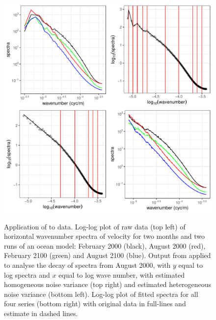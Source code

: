 \documentclass[article]{jss}
\begin{document}
\begin{figure}
\centering
{\includegraphics{figures/cpop_real_data_ggplot.pdf}}
\caption{Application of  to  data. Log-log plot of raw data (top left) of horizontal wavenumber spectra of velocity for two months and two runs of an ocean model: February 2000 (black), August 2000 (red), February 2100 (green) and August 2100 (blue). Output from  applied to analyse the decay of spectra from August 2000, with $y$ equal to log spectra and $x$ equal to log wave number, with estimated homogeneous noise variance (top right) and estimated heterogeneous noise variance (bottom left). Log-log plot of fitted spectra for all four series (bottom right) with original data in full-lines and estimate in dashed lines. 
}
\label{fig:crops.data}
\end{figure}
\end{document}
